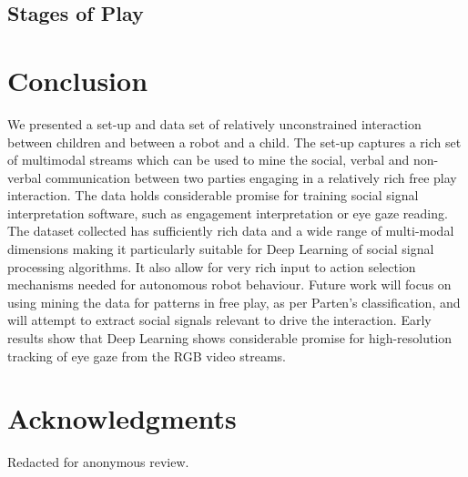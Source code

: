 \documentclass[sigconf]{acmart}
\begin{document}
\subsection{Stages of Play}


\section{Conclusion}
\label{sec:conclusion}

We presented a set-up and data set of relatively unconstrained interaction
between children and between a robot and a child. The set-up captures a rich set
of multimodal streams which can be used to mine the social, verbal and
non-verbal communication between two parties engaging in a relatively rich free
play interaction. The data holds considerable promise for training social signal
interpretation software, such as engagement interpretation or eye gaze reading.
The dataset collected has sufficiently rich data and a wide range of multi-modal
dimensions making it particularly suitable for Deep Learning of social signal
processing algorithms. It also allow for very rich input to action selection
mechanisms needed for autonomous robot behaviour. Future work will focus on
using mining the data for patterns in free play, as per Parten's classification,
and will attempt to extract social signals relevant to drive the interaction.
Early results show that Deep Learning shows considerable promise for
high-resolution tracking of eye gaze from the RGB video streams.

\section*{Acknowledgments}

Redacted for anonymous review.



\end{document}
